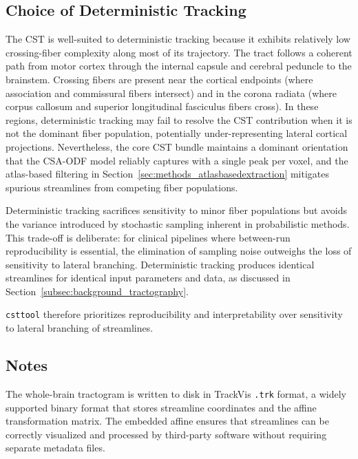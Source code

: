 \subsection{Choice of Deterministic Tracking}
\label{subsec:methods_deterministic_justification}

The CST is well-suited to deterministic tracking because it exhibits relatively low crossing-fiber complexity along most of its trajectory. The tract follows a coherent path from motor cortex through the internal capsule and cerebral peduncle to the brainstem. Crossing fibers are present near the cortical endpoints (where association and commissural fibers intersect) and in the corona radiata (where corpus callosum and superior longitudinal fasciculus fibers cross). In these regions, deterministic tracking may fail to resolve the CST contribution when it is not the dominant fiber population, potentially under-representing lateral cortical projections. Nevertheless, the core CST bundle maintains a dominant orientation that the CSA-ODF model reliably captures with a single peak per voxel, and the atlas-based filtering in Section~\ref{sec:methods_atlasbasedextraction} mitigates spurious streamlines from competing fiber populations.

Deterministic tracking sacrifices sensitivity to minor fiber populations but avoids the variance introduced by stochastic sampling inherent in probabilistic methods. This trade-off is deliberate: for clinical pipelines where between-run reproducibility is essential, the elimination of sampling noise outweighs the loss of sensitivity to lateral branching. Deterministic tracking produces identical streamlines for identical input parameters and data, as discussed in Section~\ref{subsec:background_tractography}.

\texttt{csttool} therefore prioritizes reproducibility and interpretability over sensitivity to lateral branching of streamlines. 

\subsection{Notes}
\label{subsec:methods_tractography_notes}

The whole-brain tractogram is written to disk in TrackVis \texttt{.trk} format, a widely supported binary format that stores streamline coordinates and the affine transformation matrix. The embedded affine ensures that streamlines can be correctly visualized and processed by third-party software without requiring separate metadata files.

